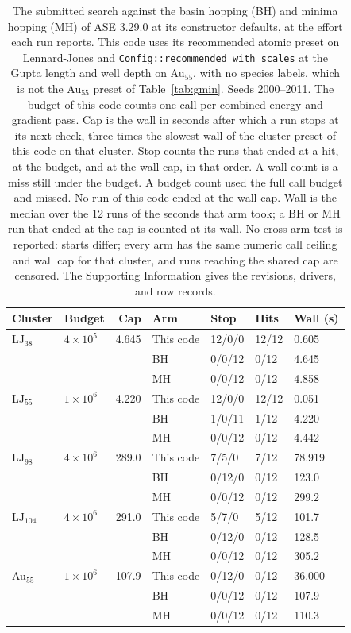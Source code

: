 \documentclass[journal=jctcce,manuscript=article]{achemso}
\begin{document}
\begin{table}
\caption{The submitted search against the basin hopping (BH) and minima hopping
(MH) of ASE 3.29.0 at its constructor defaults, at the effort each run reports.
This code uses its recommended atomic preset on
Lennard-Jones and \texttt{Config::recommended\_with\_scales} at the Gupta length and well depth
on Au\(_{55}\), with no species labels, which is not the Au\(_{55}\) preset of Table~\ref{tab:gmin}.
Seeds 2000--2011.
The budget of this code counts one call per combined energy and gradient pass.
Cap is the wall in seconds after which a run stops at its next check, three times
the slowest wall of the cluster preset of this code on that cluster.
Stop counts the runs that ended at a hit, at the budget, and at the wall cap, in that order.
A wall count is a miss still under the budget. A budget count used the full call budget and missed.
No run of this code ended at the wall cap.
Wall is the median over the 12 runs of the seconds that arm took;
a BH or MH run that ended at the cap is counted at its wall.
No cross-arm test is reported: starts differ; every arm has the same numeric call
ceiling and wall cap for that cluster, and runs reaching the shared cap are censored.
The Supporting Information gives the revisions, drivers, and row records.}
\label{tab:ase}
\centering
\scriptsize
\setlength{\tabcolsep}{3pt}
\setlength{\arraystretch}{0.92}
\begin{tabular}{@{}llrllll@{}}
\toprule
Cluster & Budget & Cap & Arm & Stop & Hits & Wall (s) \\
\midrule
LJ\(_{38}\) & \(4\times 10^{5}\) & 4.645 & This code & 12/0/0 & 12/12 & 0.605 \\
 &  &  & BH & 0/0/12 & 0/12 & 4.645 \\
 &  &  & MH & 0/0/12 & 0/12 & 4.858 \\
LJ\(_{55}\) & \(1\times 10^{6}\) & 4.220 & This code & 12/0/0 & 12/12 & 0.051 \\
 &  &  & BH & 1/0/11 & 1/12 & 4.220 \\
 &  &  & MH & 0/0/12 & 0/12 & 4.442 \\
LJ\(_{98}\) & \(4\times 10^{6}\) & 289.0 & This code & 7/5/0 & 7/12 & 78.919 \\
 &  &  & BH & 0/12/0 & 0/12 & 123.0 \\
 &  &  & MH & 0/0/12 & 0/12 & 299.2 \\
LJ\(_{104}\) & \(4\times 10^{6}\) & 291.0 & This code & 5/7/0 & 5/12 & 101.7 \\
 &  &  & BH & 0/12/0 & 0/12 & 128.5 \\
 &  &  & MH & 0/0/12 & 0/12 & 305.2 \\
Au\(_{55}\) & \(1\times 10^{6}\) & 107.9 & This code & 0/12/0 & 0/12 & 36.000 \\
 &  &  & BH & 0/0/12 & 0/12 & 107.9 \\
 &  &  & MH & 0/0/12 & 0/12 & 110.3 \\
\bottomrule
\end{tabular}
\end{table}
\end{document}
